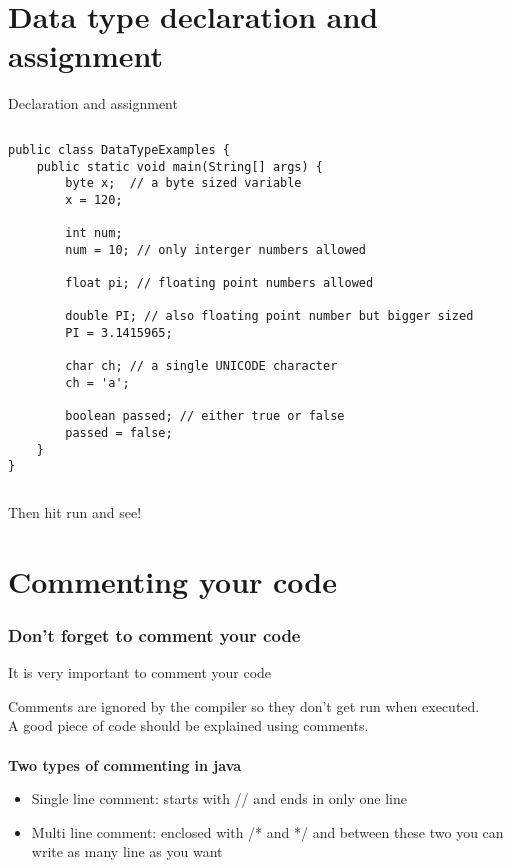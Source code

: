 \documentclass{beamer}
\begin{document}
\section{Data type declaration and assignment}

\begin{frame}[fragile]{ Declaration and assignment}

\begin{columns}[T]
\begin{column}{\textwidth}
\begin{lstlisting}
public class DataTypeExamples {
    public static void main(String[] args) {
        byte x;  // a byte sized variable
        x = 120;
        
        int num;
        num = 10; // only interger numbers allowed

        float pi; // floating point numbers allowed

        double PI; // also floating point number but bigger sized
        PI = 3.1415965;

        char ch; // a single UNICODE character 
        ch = 'a';
        
        boolean passed; // either true or false
        passed = false;
    }
}
\end{lstlisting}
\end{column}
\end{columns}
\vspace{0.4in} Then hit run and see!
\end{frame}


\section{Commenting your code}

\begin{frame}
\frametitle{Don't forget to comment your code}
\centerline{\huge{It is very important to comment your code}}
\vspace{0.2in}
Comments are ignored by the compiler so they don't get run when executed. \\
A good piece of code should be explained using comments.\\~\\
\textbf{Two types of commenting in java}
\begin{itemize}
\item Single line comment: starts with // and ends in only one line
\item Multi line comment: enclosed with /* and */ and between these two you can write as many line as you want
\end{itemize}
\end{frame}
\end{document}
